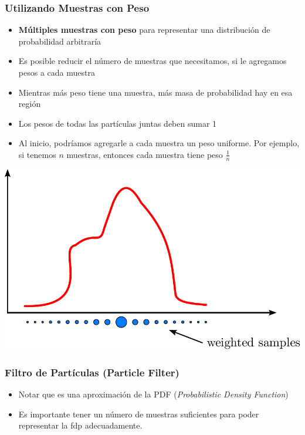\begin{frame}
    \frametitle{Utilizando Muestras con Peso}
    \footnotesize
    \begin{itemize}
        \item \textbf{Múltiples muestras con peso} para representar una distribución de probabilidad arbitraría
        \item Es posible reducir el número de muestras que necesitamos, si le agregamos pesos a cada muestra
        \item Mientras más peso tiene una muestra, más masa de probabilidad hay en esa región
        \item Los pesos de todas las partículas juntas deben sumar 1
        \item Al inicio, podríamos agregarle a cada muestra un peso uniforme. Por ejemplo, si tenemos $n$ muestras, entonces cada muestra tiene peso $\frac{1}{n}$
    \end{itemize}
    
    \begin{center}
        \includegraphics[width=0.5\columnwidth]{./images/particle_filter/arbitrary_distribution_weighted_samples.pdf}
    \end{center}
    
\end{frame}

\begin{frame}
    \frametitle{Filtro de Partículas (Particle Filter)}
    
    \footnotesize
    \begin{itemize}
        \item Notar que es una aproximación de la PDF (\emph{Probabilistic Density Function})
        \item Es importante tener un número de muestras suficientes para poder representar la fdp adecuadamente.
    \end{itemize}
    
    
\end{frame}

